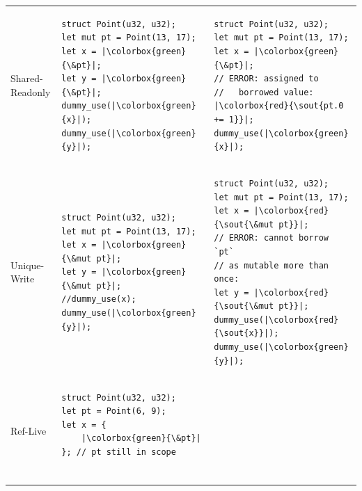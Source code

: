 \documentclass[a4paper,12pt,openright]{book}
\newcommand{\goodexample}[1]{\colorbox{green}{#1}}
\newcommand{\badexample}[1]{\colorbox{red}{\sout{#1}}}
\begin{document}
{\begin{table}[!htbp]
\begin{tabular}{p{} p{} p{}}
		Shared-Readonly                                             &                                     %
		\begin{minipage}[t]{0.41\textwidth}
			\begin{verbatim}
struct Point(u32, u32);
let mut pt = Point(13, 17);
let x = |\goodexample{\&pt}|;
let y = |\goodexample{\&pt}|;
dummy_use(|\goodexample{x}|); dummy_use(|\goodexample{y}|);
\end{verbatim}
		\end{minipage} &                                        %
		\begin{minipage}[t]{0.41\textwidth}
			\begin{verbatim}
struct Point(u32, u32);
let mut pt = Point(13, 17);
let x = |\goodexample{\&pt}|;
// ERROR: assigned to
//   borrowed value:
|\badexample{pt.0 += 1}|;
dummy_use(|\goodexample{x}|);
\end{verbatim}
		\end{minipage}                                                  \\
		Unique-Write                                                &                                     %
		\begin{minipage}[t]{0.41\textwidth}
			\begin{verbatim}
struct Point(u32, u32);
let mut pt = Point(13, 17);
let x = |\goodexample{\&mut pt}|;
let y = |\goodexample{\&mut pt}|;
//dummy_use(x);
dummy_use(|\goodexample{y}|);
\end{verbatim}
		\end{minipage}           &                                                  %
		\begin{minipage}[t]{0.41\textwidth}
			\begin{verbatim}
struct Point(u32, u32);
let mut pt = Point(13, 17);
let x = |\badexample{\&mut pt}|;
// ERROR: cannot borrow `pt`
// as mutable more than once:
let y = |\badexample{\&mut pt}|;
dummy_use(|\badexample{x}|);
dummy_use(|\goodexample{y}|);
\end{verbatim}
		\end{minipage}                                                  \\
		Ref-Live                                                    &                                     %
		\begin{minipage}[t]{0.41\textwidth}
			\begin{verbatim}
struct Point(u32, u32);
let pt = Point(6, 9);
let x = {
    |\goodexample{\&pt}|
}; // pt still in scope


\end{verbatim}
\end{minipage}
\end{tabular}
\end{table}}
\end{document}
